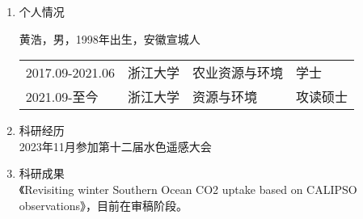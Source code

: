\cleardoublepage
{}


\begin{enumerate}
    \item 个人情况
    
        黄浩，男，1998年出生，安徽宣城人
        
        \begin{tabular}{p{}p{}p{}p{}}
            2017.09-2021.06 & 浙江大学 & 农业资源与环境 & 学士 \\
            2021.09-至今& 浙江大学 & 资源与环境 &攻读硕士\\
        \end{tabular}
        
    \item 科研经历\\
        2023年11月参加第十二届水色遥感大会
    \item 科研成果\\
        《Revisiting winter Southern Ocean CO2 uptake based on CALIPSO observations》，目前在审稿阶段。
\end{enumerate}

